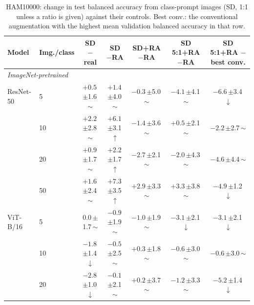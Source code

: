 \begin{table}[htbp]
\centering
\footnotesize
\setlength{\tabcolsep}{4pt}
\caption{HAM10000: change in test balanced accuracy from class-prompt images (SD, 1:1 unless a ratio is given) against their controls. Best conv.: the conventional augmentation with the highest mean validation balanced accuracy in that row.}
\label{tab:paper-ham10000-sd}
\begin{tabular}{llccccc}
\toprule
Model & Img./class & \shortstack{SD\\$-$real} & \shortstack{SD\\$-$RA} & \shortstack{SD+RA\\$-$RA} & \shortstack{SD 5:1+RA\\$-$RA} & \shortstack{SD 5:1+RA\\$-$best conv.} \\
\midrule
\multicolumn{7}{l}{\textit{ImageNet-pretrained}} \\
ResNet-50 & 5 & $+0.5$\,{\scriptsize$\pm$1.6}\,$\sim$ & $+1.4$\,{\scriptsize$\pm$4.0}\,$\sim$ & $-0.3$\,{\scriptsize$\pm$5.0}\,$\sim$ & $-4.1$\,{\scriptsize$\pm$4.1}\,$\sim$ & $-6.6$\,{\scriptsize$\pm$3.4}\,$\downarrow$ \\
 & 10 & $+2.2$\,{\scriptsize$\pm$2.8}\,$\sim$ & $+6.1$\,{\scriptsize$\pm$3.1}\,$\uparrow$ & $-1.4$\,{\scriptsize$\pm$3.6}\,$\sim$ & $+0.5$\,{\scriptsize$\pm$2.1}\,$\sim$ & $-2.2$\,{\scriptsize$\pm$2.7}\,$\sim$ \\
 & 20 & $+0.9$\,{\scriptsize$\pm$1.7}\,$\sim$ & $+2.2$\,{\scriptsize$\pm$1.7}\,$\uparrow$ & $-2.7$\,{\scriptsize$\pm$2.1}\,$\sim$ & $-2.0$\,{\scriptsize$\pm$4.3}\,$\sim$ & $-4.6$\,{\scriptsize$\pm$4.4}\,$\sim$ \\
 & 50 & $+1.6$\,{\scriptsize$\pm$2.4}\,$\sim$ & $+7.3$\,{\scriptsize$\pm$3.5}\,$\uparrow$ & $+2.9$\,{\scriptsize$\pm$3.3}\,$\sim$ & $+3.3$\,{\scriptsize$\pm$3.8}\,$\sim$ & $-4.9$\,{\scriptsize$\pm$1.2}\,$\downarrow$ \\
\addlinespace[2pt]
ViT-B/16 & 5 & $0.0$\,{\scriptsize$\pm$1.7}\,$\sim$ & $-0.9$\,{\scriptsize$\pm$1.9}\,$\sim$ & $-1.0$\,{\scriptsize$\pm$1.9}\,$\sim$ & $-3.1$\,{\scriptsize$\pm$2.1}\,$\downarrow$ & $-3.1$\,{\scriptsize$\pm$2.1}\,$\downarrow$ \\
 & 10 & $-1.8$\,{\scriptsize$\pm$1.4}\,$\downarrow$ & $-0.5$\,{\scriptsize$\pm$2.5}\,$\sim$ & $+0.3$\,{\scriptsize$\pm$1.8}\,$\sim$ & $-0.6$\,{\scriptsize$\pm$3.0}\,$\sim$ & $-0.6$\,{\scriptsize$\pm$3.0}\,$\sim$ \\
 & 20 & $-2.8$\,{\scriptsize$\pm$1.0}\,$\downarrow$ & $-0.1$\,{\scriptsize$\pm$2.1}\,$\sim$ & $+0.2$\,{\scriptsize$\pm$3.7}\,$\sim$ & $-1.2$\,{\scriptsize$\pm$3.3}\,$\sim$ & $-5.2$\,{\scriptsize$\pm$1.4}\,$\downarrow$ \\

\end{tabular}
\end{table}
